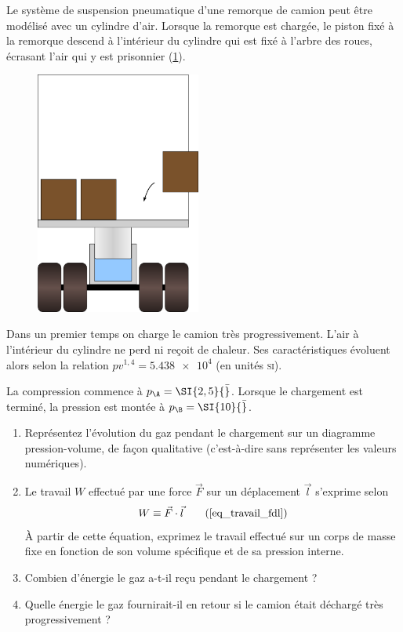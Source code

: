 	Le système de suspension pneumatique d’une remorque de camion peut être modélisé avec un cylindre d’air. Lorsque la remorque est chargée, le piston fixé à la remorque descend à l’intérieur du cylindre qui est fixé à l’arbre des roues, écrasant l’air qui y est prisonnier (\cref{fig_camion}).

	\begin{figure}
	\begin{center}
		\includegraphics[height=8cm]{images/piston_camion.png}
	\end{center}
	\label{fig_camion}
	\end{figure}
	
	Dans un premier temps on charge le camion très progressivement. L’air à l’intérieur du cylindre ne perd ni reçoit de chaleur. Ses caractéristiques évoluent alors selon la relation $p v^{1,4} = \num{5,438e4}$ (en unités \textsc{si}).
	
	La compression commence à $p_\A = \SI{2,5}{\bar}$. Lorsque le chargement est terminé, la pression est montée à $p_\B = \SI{10}{\bar}$.
	
	\begin{enumerate}
		\item Représentez l’évolution du gaz pendant le chargement sur un diagramme pression-volume, de façon qualitative (c’est-à-dire sans représenter les valeurs numériques).
		\item Le travail $W$ effectué par une force $\vec F$ sur un déplacement $\vec l$ s’exprime selon
			\begin{equation}
				W \equiv \vec F \cdot \vec l 	\tag{\ref{eq_travail_fdl}}
			\end{equation}
			À partir de cette équation, exprimez le travail effectué sur un corps de masse fixe en fonction de son volume spécifique et de sa pression interne.
		\item Combien d’énergie le gaz a-t-il reçu pendant le chargement ?
		\item Quelle énergie le gaz fournirait-il en retour si le camion était déchargé très progressivement ?
	\end{enumerate}
	
